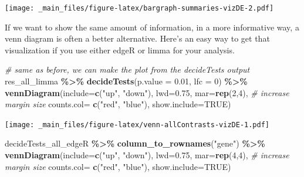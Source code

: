 \documentclass[
]{book}
\newenvironment{Shaded}{\begin{snugshade}}{\end{snugshade}}
\newcommand{\AttributeTok}[1]{\textcolor[rgb]{0.13,0.29,0.53}{#1}}
\newcommand{\CommentTok}[1]{\textcolor[rgb]{0.56,0.35,0.01}{\textit{#1}}}
\newcommand{\ConstantTok}[1]{\textcolor[rgb]{0.56,0.35,0.01}{#1}}
\newcommand{\DecValTok}[1]{\textcolor[rgb]{0.00,0.00,0.81}{#1}}
\newcommand{\FloatTok}[1]{\textcolor[rgb]{0.00,0.00,0.81}{#1}}
\newcommand{\FunctionTok}[1]{\textcolor[rgb]{0.13,0.29,0.53}{\textbf{#1}}}
\newcommand{\NormalTok}[1]{#1}
\newcommand{\SpecialCharTok}[1]{\textcolor[rgb]{0.81,0.36,0.00}{\textbf{#1}}}
\newcommand{\StringTok}[1]{\textcolor[rgb]{0.31,0.60,0.02}{#1}}
\begin{document}
\texttt{[image: \_main\_files/figure-latex/bargraph-summaries-vizDE-2.pdf]}

If we want to show the same amount of information, in a more informative way, a venn diagram is often a better alternative. Here's an easy way to get that visualization if you use either edgeR or limma for your analysis.

\begin{Shaded}
\begin{Highlighting}[]
\CommentTok{\# same as before, we can make the plot from the decideTests output}
\NormalTok{res\_all\_limma }\SpecialCharTok{\%\textgreater{}\%}
  \FunctionTok{decideTests}\NormalTok{(}\AttributeTok{p.value =} \FloatTok{0.01}\NormalTok{, }\AttributeTok{lfc =} \DecValTok{0}\NormalTok{) }\SpecialCharTok{\%\textgreater{}\%}
  \FunctionTok{vennDiagram}\NormalTok{(}\AttributeTok{include=}\FunctionTok{c}\NormalTok{(}\StringTok{"up"}\NormalTok{, }\StringTok{"down"}\NormalTok{),}
              \AttributeTok{lwd=}\FloatTok{0.75}\NormalTok{,}
              \AttributeTok{mar=}\FunctionTok{rep}\NormalTok{(}\DecValTok{2}\NormalTok{,}\DecValTok{4}\NormalTok{), }\CommentTok{\# increase margin size}
              \AttributeTok{counts.col=} \FunctionTok{c}\NormalTok{(}\StringTok{"red"}\NormalTok{, }\StringTok{"blue"}\NormalTok{),}
              \AttributeTok{show.include=}\ConstantTok{TRUE}\NormalTok{)}
\end{Highlighting}
\end{Shaded}

\texttt{[image: \_main\_files/figure-latex/venn-allContrasts-vizDE-1.pdf]}

\begin{Shaded}
\begin{Highlighting}[]
\NormalTok{decideTests\_all\_edgeR }\SpecialCharTok{\%\textgreater{}\%}
  \FunctionTok{column\_to\_rownames}\NormalTok{(}\StringTok{"gene"}\NormalTok{) }\SpecialCharTok{\%\textgreater{}\%}
  \FunctionTok{vennDiagram}\NormalTok{(}\AttributeTok{include=}\FunctionTok{c}\NormalTok{(}\StringTok{"up"}\NormalTok{, }\StringTok{"down"}\NormalTok{),}
              \AttributeTok{lwd=}\FloatTok{0.75}\NormalTok{,}
              \AttributeTok{mar=}\FunctionTok{rep}\NormalTok{(}\DecValTok{4}\NormalTok{,}\DecValTok{4}\NormalTok{), }\CommentTok{\# increase margin size}
              \AttributeTok{counts.col=} \FunctionTok{c}\NormalTok{(}\StringTok{"red"}\NormalTok{, }\StringTok{"blue"}\NormalTok{),}
              \AttributeTok{show.include=}\ConstantTok{TRUE}\NormalTok{)}
\end{Highlighting}
\end{Shaded}
\end{document}

